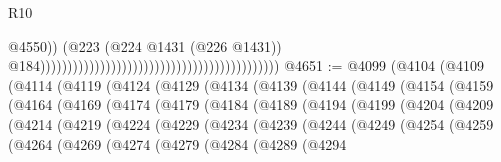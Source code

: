 \begin{lexlean}{R10}
\begin{coremodule}
                                                                                              @4550))
                                                                                          (@223
                                                                                            (@224
                                                                                              @1431
                                                                                              (@226
                                                                                                @1431))
                                                                                            @184))))))))))))))))))))))))))))))))))))))))))))
@4651 := @4099
    (@4104
      (@4109
        (@4114
          (@4119
            (@4124
              (@4129
                (@4134
                  (@4139
                    (@4144
                      (@4149
                        (@4154
                          (@4159
                            (@4164
                              (@4169
                                (@4174
                                  (@4179
                                    (@4184
                                      (@4189
                                        (@4194
                                          (@4199
                                            (@4204
                                              (@4209
                                                (@4214
                                                  (@4219
                                                    (@4224
                                                      (@4229
                                                        (@4234
                                                          (@4239
                                                            (@4244
                                                              (@4249
                                                                (@4254
                                                                  (@4259
                                                                    (@4264
                                                                      (@4269
                                                                        (@4274
                                                                          (@4279
                                                                            (@4284
                                                                              (@4289
                                                                                (@4294

\end{coremodule}
\end{lexlean}
